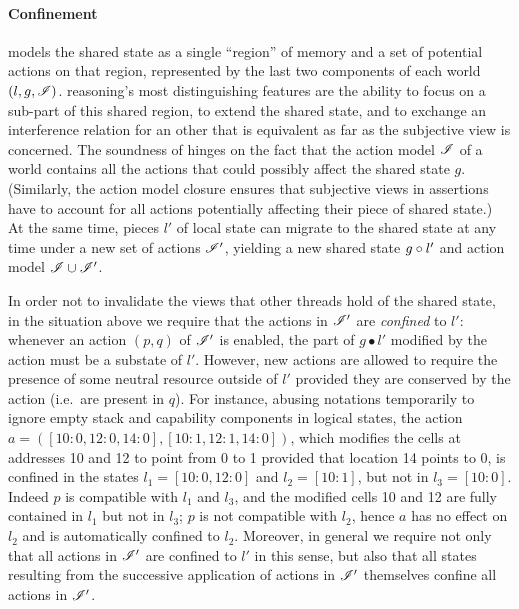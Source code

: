 \paragraph{Confinement}
\colosl models the shared state as a single ``region'' of memory and a
set of potential actions on that region, represented by the last two
components of each world $(l,g,\mathscr{I})$. \colosl reasoning's most
distinguishing features are the ability to focus on a sub-part of this
shared region, to extend the shared state, and to exchange an
interference relation for an other that is equivalent as far as the
subjective view is concerned. The soundness of \colosl hinges on the
fact that the action model $\mathscr{I}$ of a world contains all the actions
that could possibly affect the shared state $g$. (Similarly, the
action model closure ensures that subjective views in assertions have
to account for all actions potentially affecting their piece of shared
state.) At the same time, pieces $l'$ of local state can migrate to
the shared state at any time under a new set of actions $\mathscr{I}'$,
yielding a new shared state $g\circ l'$ and action model $\mathscr{I}
\cup \mathscr{I}'$.

In order not to invalidate the views that other threads hold of the
shared state, in the situation above we require that the actions in
$\mathscr{I}'$ are \emph{confined} to $l'$: whenever an action $(p,q)$ of
$\mathscr{I}'$ is enabled, the part of $g\bullet l'$ modified by the action
must be a substate of $l'$.  However, new actions are allowed to
require the presence of some neutral resource outside of $l'$ provided
they are conserved by the action (i.e.\ are present in $q$).
%
For instance, abusing notations temporarily to ignore empty stack and
capability components in logical states, the action $a = ([10:0, 12:0,
  14:0],[10:1, 12:1, 14:0])$, which modifies the cells at addresses 10
and 12 to point from 0 to 1 provided that location 14 points to 0, is
confined in the states $l_1=[10:0,12:0]$ and $l_2=[10:1]$, but not in
$l_3=[10:0]$. Indeed $p$ is compatible with $l_1$ and $l_3$, and the
modified cells 10 and 12 are fully contained in $l_1$ but not in
$l_3$; $p$ is not compatible with $l_2$, hence $a$ has no effect on
$l_2$ and is automatically confined to $l_2$.
%
Moreover, in general we require not only that all actions in $\mathscr{I}'$
are confined to $l'$ in this sense, but also that all states resulting
from the successive application of actions in $\mathscr{I}'$ themselves confine
all actions in $\mathscr{I}'$.

